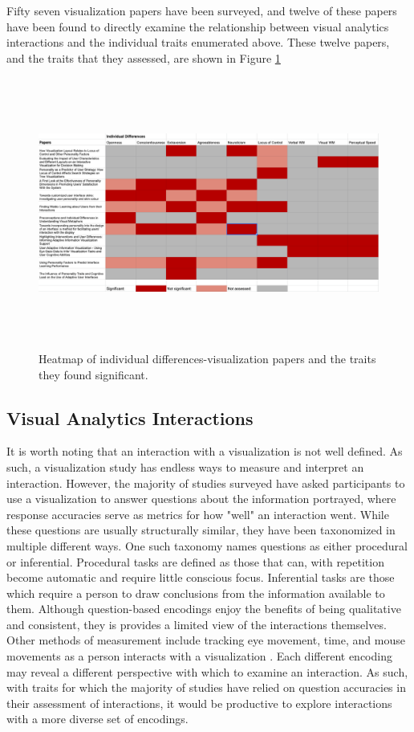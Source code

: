 \documentclass[conference]{IEEEtran}
\begin{document}
Fifty seven visualization papers have been surveyed, and twelve of these
papers have been found to directly examine the relationship between visual
analytics interactions and the individual traits enumerated above. These
twelve papers, and the traits that they assessed, are shown in Figure \ref{fig}
\begin{figure}[htbp]
    \centerline{\includegraphics[height=24em]{fig1.png}}
    \caption{Heatmap of individual differences-visualization papers and the traits
    they found significant.}
    \label{fig}
\end{figure}

\subsection{Visual Analytics Interactions}
It is worth noting that an interaction with a visualization is not well defined. As
such, a visualization study has endless ways to measure and interpret an interaction.
However, the majority of studies surveyed have asked participants to use a visualization
to answer questions about the information portrayed, where response accuracies
serve as metrics for how "well" an interaction went. While these questions are
usually structurally similar, they have been taxonomized in multiple different ways.
One such taxonomy names questions as either procedural or inferential\cite{Green2010UsingPF}.
Procedural tasks are defined as those that can, with repetition become automatic and require
little conscious focus. Inferential tasks are those which require a person to draw conclusions
from the information available to them. Although question-based encodings enjoy the
benefits of being qualitative and consistent, they is provides a limited view of the
interactions themselves. Other methods of measurement include tracking eye movement,
time, and mouse movements as a person interacts with a visualization
\cite{Green2010UsingPF, Waldo}. Each different encoding may reveal a different perspective
with which to examine an interaction. As such, with traits for which the majority of studies
have relied on question accuracies in their assessment of interactions, it would be productive
to explore interactions with a more diverse set of encodings.
\end{document}
